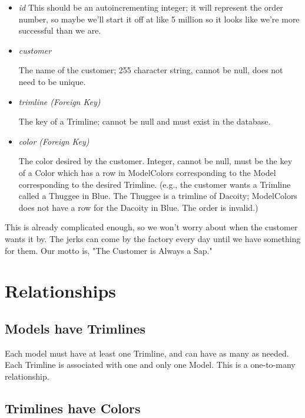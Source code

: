 \documentclass[11pt,letterpaper,oneside]{amsart}
\begin{document}
\begin{itemize}

\item \emph{id}
	This should be an autoincrementing integer; it will represent the order number, so maybe we'll start it off at like 5 million so it looks like we're more successful than we are.

\item \emph{customer}

	The name of the customer; 255 character string, cannot be null, does not need to be unique.
	
\item \emph{trimline (Foreign Key)}
	
	The key of a Trimline; cannot be null and must exist in the database.
	
\item \emph{color (Foreign Key)}

	The color desired by the customer.  Integer, cannot be null, must be the key of a Color which has a row in ModelColors corresponding to the Model corresponding to the desired Trimline.  (e.g., the customer wants a Trimline called a Thuggee in Blue.  The Thuggee is a trimline of Dacoity; ModelColors does not have a row for the Dacoity in Blue.  The order is invalid.)
	
\end{itemize}

This is already complicated enough, so we won't worry about when the customer wants it by.  The jerks can come by the factory every day until we have something for them.  Our motto is, "The Customer is Always a Sap."

\section*{Relationships}

\subsection*{Models have Trimlines}

Each model must have at least one Trimline, and can have as many as needed.  Each Trimline is associated with one and only one Model. This is a one-to-many relationship.

\subsection*{Trimlines have Colors}
\end{document}
